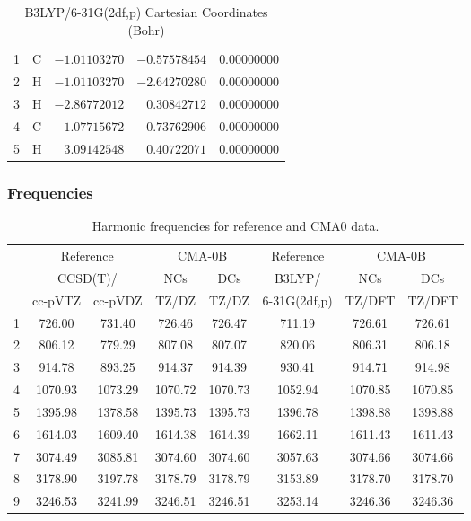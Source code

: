 \documentclass[10pt,oneside]{article}
\begin{document}
\begin{table}[h!]
\centering
\caption{B3LYP/6-31G(2df,p) Cartesian Coordinates (Bohr)}
\begin{tabular}{llrrr}
1  & C  & $-1.01103270$ & $-0.57578454$ & $ 0.00000000$ \\
2  & H  & $-1.01103270$ & $-2.64270280$ & $ 0.00000000$ \\
3  & H  & $-2.86772012$ & $ 0.30842712$ & $ 0.00000000$ \\
4  & C  & $ 1.07715672$ & $ 0.73762906$ & $ 0.00000000$ \\
5  & H  & $ 3.09142548$ & $ 0.40722071$ & $ 0.00000000$ \\
\end{tabular}
\end{table}

\clearpage

\subsubsection*{Frequencies}
\begin{table}[h!]
\centering
\caption{Harmonic frequencies for reference and CMA0 data.}
\begin{tabular}{cccccccc}
\toprule
{} & \multicolumn{2}{c}{Reference} & \multicolumn{2}{c}{CMA-0B} &    Reference & \multicolumn{2}{c}{CMA-0B} \\
{} & \multicolumn{2}{c}{CCSD(T)/} &     NCs &     DCs &       B3LYP/ &     NCs &     DCs \\
{} &   cc-pVTZ & cc-pVDZ &   TZ/DZ &   TZ/DZ & 6-31G(2df,p) &  TZ/DFT &  TZ/DFT \\
\midrule
1 &    726.00 &  731.40 &  726.46 &  726.47 &       711.19 &  726.61 &  726.61 \\
2 &    806.12 &  779.29 &  807.08 &  807.07 &       820.06 &  806.31 &  806.18 \\
3 &    914.78 &  893.25 &  914.37 &  914.39 &       930.41 &  914.71 &  914.98 \\
4 &   1070.93 & 1073.29 & 1070.72 & 1070.73 &      1052.94 & 1070.85 & 1070.85 \\
5 &   1395.98 & 1378.58 & 1395.73 & 1395.73 &      1396.78 & 1398.88 & 1398.88 \\
6 &   1614.03 & 1609.40 & 1614.38 & 1614.39 &      1662.11 & 1611.43 & 1611.43 \\
7 &   3074.49 & 3085.81 & 3074.60 & 3074.60 &      3057.63 & 3074.66 & 3074.66 \\
8 &   3178.90 & 3197.78 & 3178.79 & 3178.79 &      3153.89 & 3178.70 & 3178.70 \\
9 &   3246.53 & 3241.99 & 3246.51 & 3246.51 &      3253.14 & 3246.36 & 3246.36 \\
\bottomrule
\end{tabular}
\end{table}
\end{document}
